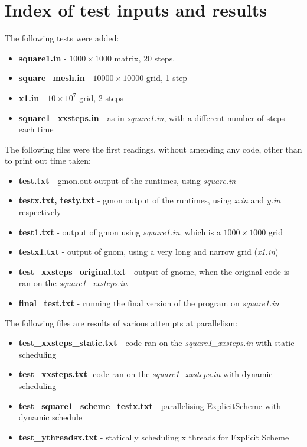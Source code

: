 \documentclass[11pt,journal]{IEEEtran}
\begin{document}
	
	
		
		
	\appendices
	\section{Index of test inputs and results}
	The following tests were added:
	\begin{itemize}
		\item \textbf{square1.in} - $1000 \times 1000$ matrix, 20 steps.
		\item \textbf{square\_mesh.in} - $10000 \times 10000$ grid, 1 step
		\item \textbf{x1.in} - $10 \times 10^7$ grid, 2 steps
		\item \textbf{square1\_xxsteps.in} - as in \emph{square1.in}, with a different number of steps each time

	\end{itemize}
	
	The following files were the first readings, without amending any code, other than to print out time taken:
	
	\begin{itemize}
		\item \textbf{test.txt} - gmon.out output of the runtimes, using \emph{square.in}
		\item \textbf{testx.txt, testy.txt} - gmon output of the runtimes, using \emph{x.in} and \emph{y.in} respectively
		\item \textbf{test1.txt} - output of gmon using \emph{square1.in}, which is a $1000 \times 1000$ grid
		\item \textbf{testx1.txt} - output of gnom, using a very long and narrow grid (\emph{x1.in})
		\item \textbf{test\_xxsteps\_original.txt} - output of gnome, when the original code is ran on the \emph{square1\_xxsteps.in}
		\item \textbf{final\_test.txt} - running the final version of the program on \emph{square1.in}
		
	
	\end{itemize}

	The following files are results of various attempts at parallelism:
	\begin{itemize}
		\item \textbf{test\_xxsteps\_static.txt} - code ran on the \emph{square1\_xxsteps.in} with static scheduling
		\item \textbf{test\_xxsteps.txt}- code ran on the \emph{square1\_xxsteps.in} with dynamic scheduling
		\item \textbf{test\_square1\_scheme\_testx.txt} - parallelising ExplicitScheme with dynamic schedule
		\item \textbf{test\_ythreadsx.txt} - statically scheduling x threads for Explicit Scheme
		
	\end{itemize}
\end{document}
